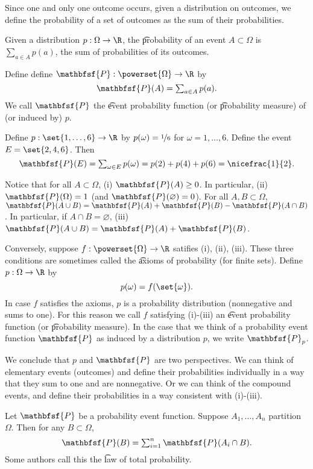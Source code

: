 

Since one and only one outcome occurs, given a distribution on outcomes, we define the probability of a set of outcomes as the sum of their probabilities.


Given a distribution $p: \Omega  \to \R $, the \t{probability of an event} $A \subset \Omega $ is $\sum_{a \in A} p(a)$, the sum of probabilities of its outcomes.

Define define $\mathbfsf{P} : \powerset{\Omega } \to \R $ by
  \[
\textstyle
\mathbfsf{P} (A) = \sum_{a \in A} p(a).
  \]
We call $\mathbfsf{P} $ the \t{event probability function} (or \t{probability measure}) of (or induced by) $p$.

Define $p: \set{1, \dots, 6} \to \R $ by $p(\omega ) = \nicefrac{1}{6}$ for $\omega  = 1, \dots, 6$.
Define the event $E = \set{2, 4, 6}$.
Then
  \[
\textstyle
\mathbfsf{P} (E) = \sum_{\omega  \in E} p(\omega ) = p(2) + p(4) + p(6) = \nicefrac{1}{2}.
  \]

Notice that for all $A \subset \Omega $, (i) $\mathbfsf{P} (A) \geq 0$.
In particular, (ii) $\mathbfsf{P} (\Omega ) = 1$ (and $\mathbfsf{P} (\varnothing) = 0$).
For all $A, B \subset \Omega $, $\mathbfsf{P} (A \cup B) = \mathbfsf{P} (A) + \mathbfsf{P} (B) - \mathbfsf{P} (A \cap B)$.
In particular, if $A \cap B = \varnothing$, (iii) $\mathbfsf{P} (A \cup B) = \mathbfsf{P} (A) + \mathbfsf{P} (B)$.

Conversely, suppose $f: \powerset{\Omega } \to \R $ satifies (i), (ii), (iii).
These three conditions are sometimes called the \t{axioms of probability} (for finite sets).
Define $p: \Omega  \to \R $ by
  \[
p(\omega ) = f(\set{\omega }).
  \]
In case $f$ satisfies the axioms, $p$ is a probability distribution (nonnegative and sums to one).
For this reason we call $f$ satisfying (i)-(iii) an \t{event probability function} (or \t{probability measure}).
In the case that we think of a probability event function $\mathbfsf{P} $ as induced by a distribution $p$, we write $\mathbfsf{P} _p$.

We conclude that $p$ and $\mathbfsf{P} $ are two perspectives.
We can think of elementary events (outcomes) and define their probabilities individually in a way that they sum to one and are nonnegative.
Or we can think of the compound events, and define their probabilities in a way consistent with (i)-(iii).

Let $\mathbfsf{P} $ be a probability event function.
Suppose $A_1, \dots, A_n$ partition $\Omega $.
Then for any $B \subset \Omega $,
  \[
\textstyle
\mathbfsf{P} (B) = \sum_{i = 1}^{n} \mathbfsf{P} (A_i \cap B).
  \]
Some authors call this the \t{law of total probability}.
